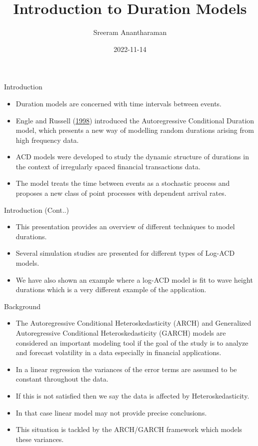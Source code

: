\documentclass[
  ignorenonframetext,
]{beamer}
\title{Introduction to Duration Models}
\author{Sreeram Anantharaman}
\date{2022-11-14}
\begin{document}
\frame{\titlepage}

\begin{frame}{Introduction}
\protect\hypertarget{introduction}{}
\begin{itemize}
\item
  Duration models are concerned with time intervals between events.
\item
  Engle and Russell (\protect\hyperlink{ref-ACD}{1998}) introduced the
  Autoregressive Conditional Duration model, which presents a new way of
  modelling random durations arising from high frequency data.
\item
  ACD models were developed to study the dynamic structure of durations
  in the context of irregularly spaced financial transactions data.
\item
  The model treats the time between events as a stochastic process and
  proposes a new class of point processes with dependent arrival rates.
\end{itemize}
\end{frame}

\begin{frame}{Introduction (Cont..)}
\protect\hypertarget{introduction-cont..}{}
\begin{itemize}
\item
  This presentation provides an overview of different techniques to
  model durations.
\item
  Several simulation studies are presented for different types of
  Log-ACD models.
\item
  We have also shown an example where a log-ACD model is fit to wave
  height durations which is a very different example of the application.
\end{itemize}
\end{frame}

\begin{frame}{Background}
\protect\hypertarget{background}{}
\begin{itemize}
\item
  The Autoregressive Conditional Heteroskedasticity (ARCH) and
  Generalized Autoregressive Conditional Heteroskedasticity (GARCH)
  models are considered an important modeling tool if the goal of the
  study is to analyze and forecast volatility in a data especially in
  financial applications.
\item
  In a linear regression the variances of the error terms are assumed to
  be constant throughout the data.
\item
  If this is not satisfied then we say the data is affected by
  Heteroskedasticity.
\item
  In that case linear model may not provide precise conclusions.
\item
  This situation is tackled by the ARCH/GARCH framework which models
  these variances.
\end{itemize}
\end{frame}
\end{document}
